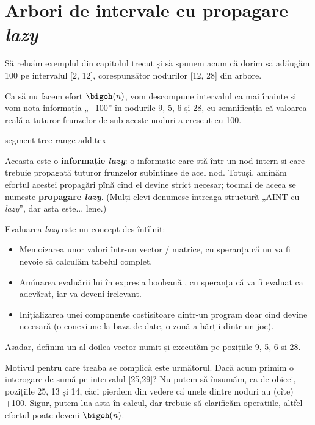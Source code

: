 \chapter{Arbori de intervale cu propagare \textit{lazy}}

Să reluăm exemplul din capitolul trecut și să spunem acum că dorim să adăugăm 100 pe intervalul [2, 12], corespunzător nodurilor [12, 28] din arbore.

Ca să nu facem efort $\bigoh(n)$, vom descompune intervalul ca mai înainte și vom nota informația „+100” în nodurile 9, 5, 6 și 28, cu semnificația că valoarea reală a tuturor frunzelor de sub aceste noduri a crescut cu 100.

{segment-tree-range-add.tex}

Aceasta este o \textbf{informație \textit{lazy}}: o informație care stă într-un nod intern și care trebuie propagată tuturor frunzelor subîntinse de acel nod. Totuși, amînăm efortul acestei propagări pînă cînd el devine strict necesar; tocmai de aceea se numește \textbf{propagare \textit{lazy}}. (Mulți elevi denumesc întreaga structură „AINT cu \textit{lazy}”, dar asta este... lene.)

Evaluarea \textit{lazy} este un concept des întîlnit:

\begin{itemize}
  \item Memoizarea unor valori într-un vector / matrice, cu speranța că nu va fi nevoie să calculăm tabelul complet.

  \item Amînarea evaluării lui  în expresia booleană , cu speranța că  va fi evaluat ca adevărat, iar  va deveni irelevant.

  \item Inițializarea unei componente costisitoare dintr-un program doar cînd devine necesară (o conexiune la baza de date, o zonă a hărții dintr-un joc).
\end{itemize}

Așadar, definim un al doilea vector numit  și executăm  pe pozițiile 9, 5, 6 și 28.

Motivul pentru care treaba se complică este următorul. Dacă acum primim o interogare de sumă pe intervalul [25,29]? Nu putem să însumăm, ca de obicei, pozițiile 25, 13 și 14, căci pierdem din vedere că unele dintre noduri au (cîte) +100. Sigur, putem lua asta în calcul, dar trebuie să clarificăm operațiile, altfel efortul poate deveni $\bigoh(n)$.

